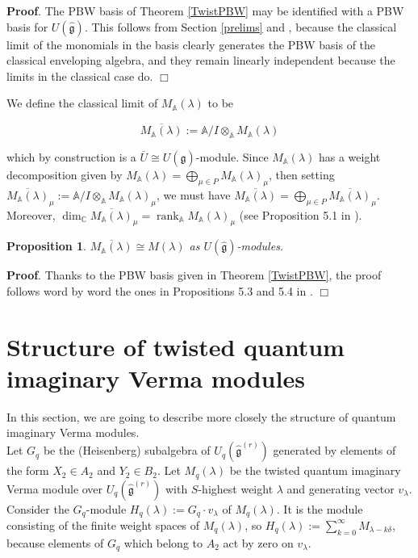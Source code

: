 \documentclass[12pt]{amsart}
\newtheorem{prop}[thm]{Proposition}
\numberwithin{equation}{section}
\newcommand{\dem }{\noindent\textbf{Proof}. }
\newcommand{\findem }{\hfill $\Box$ \vskip0.5cm }
\newcommand{\C}{\ensuremath{\mathbb{C}}}
\newcommand{\A}{\ensuremath{\mathbb{A}}}
\newcommand{\g}{\ensuremath{\mathfrak{g}}}
\newcommand{\rank}{\operatorname{rank}}
\begin{document}
\dem The PBW basis of Theorem \ref{TwistPBW} may be identified with a PBW basis for $U(\hat{\g})$. This follows from Section \ref{prelims} and \cite{B01}, because the classical limit of the monomials in the basis clearly generates the PBW basis of the classical enveloping algebra, and they remain linearly independent because the limits in the classical case do.
\findem

We define the classical limit of $M_{\A}(\lambda)$ to be 

$$ \overline{M_{\A}(\lambda)} := \A / I \otimes_{\A} M_{\A}(\lambda) $$

which by construction is a $\overline{U} \cong U(\hat{\g})$-module. Since $M_{\A}(\lambda)$ has a weight decomposition given by $M_{\A}(\lambda) = \bigoplus_{\mu \in P} M_{\A}(\lambda)_\mu$, then setting $\overline{M_{\A}(\lambda)}_\mu := \A / I \otimes_{\A} M_{\A}(\lambda)_\mu$, we must have $\overline{M_{\A}(\lambda)} = \bigoplus_{\mu \in P} \overline{M_{\A}(\lambda)}_\mu$. Moreover, $\dim_{\C}\overline{M_{\A}(\lambda)}_{\mu} = \rank_{\A} M_{\A}(\lambda)_\mu$ (see Proposition 5.1 in \cite{FGM}).

\begin{prop}
    $\overline{M_{\A}(\lambda)} \cong M(\lambda)$ as $U(\hat{\g})$-modules.
\end{prop}

\dem Thanks to the PBW basis given in Theorem \ref{TwistPBW}, the proof follows word by word the ones in Propositions 5.3 and 5.4 in \cite{FGM}.
\findem


\section{Structure of twisted quantum imaginary Verma modules}

In this section, we are going to describe more closely the structure of quantum imaginary Verma modules. \\

Let $G_q$ be the (Heisenberg) subalgebra of $U_q(\hat{\g}^{(r)})$ generated by elements of the form $X_2 \in A_2$ and $Y_2 \in B_2$. Let $M_q(\lambda)$ be the twisted quantum imaginary Verma module over $U_q(\hat{\g}^{(r)})$ with $S$-highest weight $\lambda$ and generating vector $v_\lambda$. Consider the $G_q$-module $H_q(\lambda) := G_q\cdot v_\lambda$ of $M_q(\lambda)$. It is the module consisting of the finite weight spaces of $M_q(\lambda)$, so $H_q(\lambda) := \sum_{k=0}^{\infty} M_{\lambda - k\delta}$, because elements of $G_q$ which belong to $A_2$ act by zero on $v_\lambda$.
\end{document}
